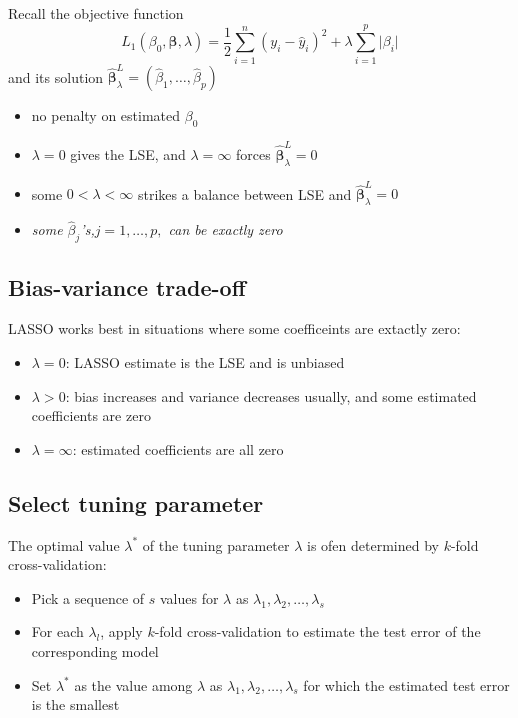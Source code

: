 \documentclass[]{article}
\providecommand{\tightlist}{%
  \setlength{\itemsep}{0pt}\setlength{\parskip}{0pt}}
\begin{document}
Recall the objective function \[
L_1(\beta_0,\boldsymbol{\beta},\lambda)= \frac{1}{2}\sum_{i=1}^n (y_i - \hat{y}_i)^2 + \lambda \sum_{i=1}^p \vert \beta_i \vert
\] and its solution
\(\hat{\boldsymbol{\beta}}^L_{\lambda}=(\hat{\beta}_1,\ldots,\hat{\beta}_p)\)

\begin{itemize}
\tightlist
\item
  no penalty on estimated \(\beta_0\)
\item
  \(\lambda=0\) gives the LSE, and \(\lambda=\infty\) forces
  \(\hat{\boldsymbol{\beta}}^L_{\lambda}=0\)
\item
  some \(0 < \lambda < \infty\) strikes a balance between LSE and
  \(\hat{\boldsymbol{\beta}}^L_{\lambda}=0\)
\item
  \emph{some \(\hat{\beta}_j\)'s,\(j=1,\ldots,p,\) can be exactly zero}
\end{itemize}

\subsection{Bias-variance trade-off}\label{bias-variance-trade-off-2}

LASSO works best in situations where some coefficeints are extactly
zero:

\begin{itemize}
\tightlist
\item
  \(\lambda=0\): LASSO estimate is the LSE and is unbiased
\item
  \(\lambda >0\): bias increases and variance decreases usually, and
  some estimated coefficients are zero
\item
  \(\lambda=\infty\): estimated coefficients are all zero
\end{itemize}

\subsection{Select tuning parameter}\label{select-tuning-parameter-1}

The optimal value \(\lambda^{\ast}\) of the tuning parameter \(\lambda\)
is ofen determined by \(k\)-fold cross-validation:

\begin{itemize}
\tightlist
\item
  Pick a sequence of \(s\) values for \(\lambda\) as
  \(\lambda_1, \lambda_2, \ldots, \lambda_s\)
\item
  For each \(\lambda_l\), apply \(k\)-fold cross-validation to estimate
  the test error of the corresponding model
\item
  Set \(\lambda^{\ast}\) as the value among \(\lambda\) as
  \(\lambda_1, \lambda_2, \ldots, \lambda_s\) for which the estimated
  test error is the smallest
\end{itemize}
\end{document}
